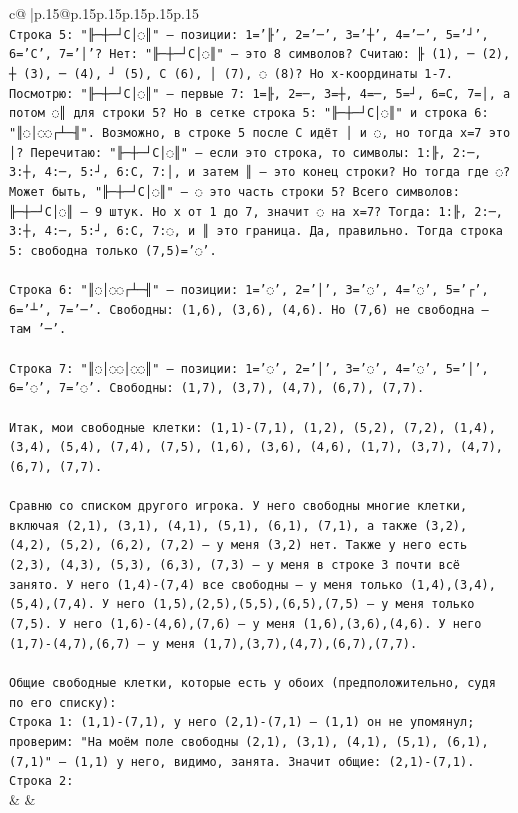 \documentclass{article}
\begin{document}
{\begin{supertabular}{c@{$\;$}|p{.15\linewidth}@{}p{.15\linewidth}p{.15\linewidth}p{.15\linewidth}p{.15\linewidth}p{.15\linewidth}}
{{{\\ 
\texttt{Строка 5: "╟─┼─┘C│◌║" — позиции: 1='╟', 2='─', 3='┼', 4='─', 5='┘', 6='C', 7='│'? Нет: "╟─┼─┘C│◌║" — это 8 символов? Считаю: ╟ (1), ─ (2), ┼ (3), ─ (4), ┘ (5), C (6), │ (7), ◌ (8)? Но x{-}координаты 1{-}7. Посмотрю: "╟─┼─┘C│◌║" — первые 7: 1=╟, 2=─, 3=┼, 4=─, 5=┘, 6=C, 7=│, а потом ◌║ для строки 5? Но в сетке строка 5: "╟─┼─┘C│◌║" и строка 6: "║◌│◌◌┌┴─╢". Возможно, в строке 5 после C идёт │ и ◌, но тогда x=7 это │? Перечитаю: "╟─┼─┘C│◌║" — если это строка, то символы: 1:╟, 2:─, 3:┼, 4:─, 5:┘, 6:C, 7:│, и затем ║ — это конец строки? Но тогда где ◌? Может быть, "╟─┼─┘C│◌║" — ◌ это часть строки 5? Всего символов: ╟─┼─┘C│◌║ — 9 штук. Но x от 1 до 7, значит ◌ на x=7? Тогда: 1:╟, 2:─, 3:┼, 4:─, 5:┘, 6:C, 7:◌, и ║ это граница. Да, правильно. Тогда строка 5: свободна только (7,5)='◌'.} \\
\\ 
\texttt{Строка 6: "║◌│◌◌┌┴─╢" — позиции: 1='◌', 2='│', 3='◌', 4='◌', 5='┌', 6='┴', 7='─'. Свободны: (1,6), (3,6), (4,6). Но (7,6) не свободна — там '─'.} \\
\\ 
\texttt{Строка 7: "║◌│◌◌│◌◌║" — позиции: 1='◌', 2='│', 3='◌', 4='◌', 5='│', 6='◌', 7='◌'. Свободны: (1,7), (3,7), (4,7), (6,7), (7,7).} \\
\\ 
\texttt{Итак, мои свободные клетки: (1,1){-}(7,1), (1,2), (5,2), (7,2), (1,4), (3,4), (5,4), (7,4), (7,5), (1,6), (3,6), (4,6), (1,7), (3,7), (4,7), (6,7), (7,7).} \\
\\ 
\texttt{Сравню со списком другого игрока. У него свободны многие клетки, включая (2,1), (3,1), (4,1), (5,1), (6,1), (7,1), а также (3,2), (4,2), (5,2), (6,2), (7,2) — у меня (3,2) нет. Также у него есть (2,3), (4,3), (5,3), (6,3), (7,3) — у меня в строке 3 почти всё занято. У него (1,4){-}(7,4) все свободны — у меня только (1,4),(3,4),(5,4),(7,4). У него (1,5),(2,5),(5,5),(6,5),(7,5) — у меня только (7,5). У него (1,6){-}(4,6),(7,6) — у меня (1,6),(3,6),(4,6). У него (1,7){-}(4,7),(6,7) — у меня (1,7),(3,7),(4,7),(6,7),(7,7).} \\
\\ 
\texttt{Общие свободные клетки, которые есть у обоих (предположительно, судя по его списку):} \\
\texttt{Строка 1: (1,1){-}(7,1), у него (2,1){-}(7,1) — (1,1) он не упомянул; проверим: "На моём поле свободны (2,1), (3,1), (4,1), (5,1), (6,1), (7,1)" — (1,1) у него, видимо, занята. Значит общие: (2,1){-}(7,1).} \\
\texttt{Строка 2:} \\
            }
        }
    }
    & & \\ \\


\end{supertabular}}
\end{document}
